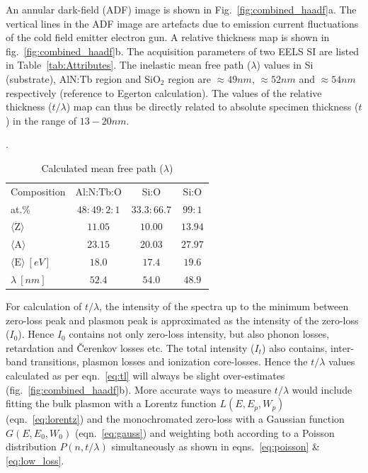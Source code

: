 \documentclass[%
 aip,
rsi,%
 amsmath,amssymb,
 reprint,%
]{revtex4-1}
\begin{document}
An annular dark-field (ADF) image is shown in Fig.~\ref{fig:combined_haadf}a. The vertical lines in the ADF image are artefacts due to emission current fluctuations of the cold field emitter electron gun. A relative thickness map is shown in fig.~\ref{fig:combined_haadf}b. The acquisition parameters of two EELS SI are listed in Table~\ref{tab:Attributes}. The inelastic mean free path ($\lambda$) values in Si (substrate), AlN:Tb region and SiO$_2$ region are $\approx49nm$, $\approx52nm$ and $\approx54nm$ respectively (reference to Egerton calculation). The values of the relative thickness ($t/\lambda$) map can thus be directly related to absolute specimen thickness ($t$) in the range of $13-20nm$.
\begin{table}[!ht]
	\caption{Calculated mean free path ($\lambda$)}.
    \label{tab:lambda}
    \begin{ruledtabular}
    	\begin{tabular}{lccc}
        	Composition&Al:N:Tb:O&Si:O&Si:O										\\
            at.\%&$48:49:2:1$&$33.3:66.7$&$99:1$								\\ \hline
        	$\langle \text{Z} \rangle$&$11.05$&$10.00$&$13.94$					\\
            $\langle \text{A} \rangle$&$23.15$&$20.03$&$27.97$					\\
            $\langle \text{E} \rangle~\left[eV\right]$&$18.0$&$17.4$&$19.6$		\\
           	$\lambda~\left[nm\right]$&$52.4$&$54.0$&$48.9$
    	\end{tabular}
    \end{ruledtabular}
\end{table}
For calculation of $t/\lambda$, the intensity of the spectra up to the minimum between zero-loss peak and plasmon peak is approximated as the intensity of the zero-loss ($I_0$). Hence $I_0$ contains not only zero-loss intensity, but also phonon losses, retardation and \v{C}erenkov losses etc. The total intensity ($I_t$) also contains, inter-band transitions, plasmon losses and ionization core-losses. Hence the $t/\lambda$ values calculated as per eqn.~\ref{eq:tl} will always be slight over-estimates (fig.~\ref{fig:combined_haadf}b). More accurate ways to measure $t/\lambda$ would include fitting the bulk plasmon with a Lorentz function $L(E,E_p,W_p)$ (eqn.~\ref{eq:lorentz}) and the monochromated zero-loss with a Gaussian function $G(E,E_0,W_0)$ (eqn.~\ref{eq:gauss}) and weighting both according to a Poisson distribution $P(n,t/\lambda)$ simultaneously as shown in eqns.~\ref{eq:poisson} \& \ref{eq:low_loss}.
\end{document}
